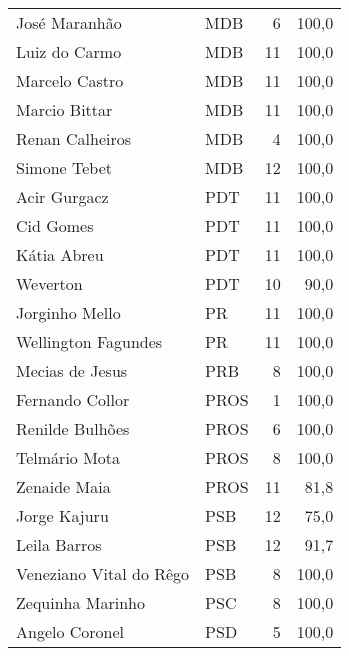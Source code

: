 \begin{longtable}{llrr}
           José Maranhão &            MDB &                   6 &        100,0 \\
           Luiz do Carmo &            MDB &                  11 &        100,0 \\
          Marcelo Castro &            MDB &                  11 &        100,0 \\
           Marcio Bittar &            MDB &                  11 &        100,0 \\
         Renan Calheiros &            MDB &                   4 &        100,0 \\
            Simone Tebet &            MDB &                  12 &        100,0 \\
            Acir Gurgacz &            PDT &                  11 &        100,0 \\
               Cid Gomes &            PDT &                  11 &        100,0 \\
             Kátia Abreu &            PDT &                  11 &        100,0 \\
                Weverton &            PDT &                  10 &         90,0 \\
          Jorginho Mello &             PR &                  11 &        100,0 \\
     Wellington Fagundes &             PR &                  11 &        100,0 \\
         Mecias de Jesus &            PRB &                   8 &        100,0 \\
         Fernando Collor &           PROS &                   1 &        100,0 \\
         Renilde Bulhões &           PROS &                   6 &        100,0 \\
           Telmário Mota &           PROS &                   8 &        100,0 \\
            Zenaide Maia &           PROS &                  11 &         81,8 \\
            Jorge Kajuru &            PSB &                  12 &         75,0 \\
            Leila Barros &            PSB &                  12 &         91,7 \\
 Veneziano Vital do Rêgo &            PSB &                   8 &        100,0 \\
        Zequinha Marinho &            PSC &                   8 &        100,0 \\
          Angelo Coronel &            PSD &                   5 &        100,0 \\

\end{longtable}
